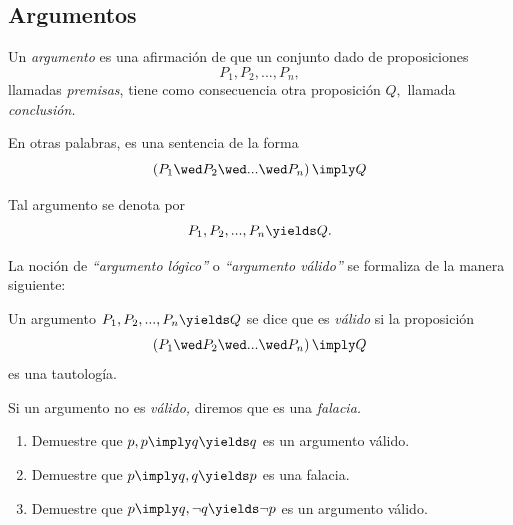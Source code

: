 \subsection{Argumentos}


 Un \emph{argumento} es una afirmación de que un conjunto dado de proposiciones $$P_{1}, P_{2},...,P_{n},$$ llamadas \emph{premisas}, tiene como consecuencia otra proposición $Q,$ llamada \emph{conclusión.}
 
 En otras palabras, es una sentencia de la forma
 $$
  \left( P_{1} \wed P_{2} \wed...\wed P_{n}\right) \imply Q
  $$
 
 
 
 Tal argumento se denota por $$P_{1}, P_{2},...,P_{n} \yields Q.$$



 La noción de \emph{``argumento lógico''} o \emph{``argumento válido''} se formaliza de la manera siguiente:
 
 
 \begin{defn}
  \label{lip:4.4}
  Un argumento $P_{1}, P_{2},...,P_{n} \yields Q$ se dice que es \emph{válido} si la proposición 
  $$
  \left( P_{1} \wed P_{2} \wed...\wed P_{n}\right) \imply Q
  $$ es una tautología.
  
   Si un argumento no es \emph{válido,} diremos que es una \emph{falacia.}
 \end{defn}




 \begin{problema}
 \label{lip:exmp:4.4}
  \begin{enumerate}
   \item Demuestre que $p, p\imply q \yields q$ es un argumento válido. 
   \item Demuestre que $p\imply q, q \yields p$ es una falacia.
   
   \item Demuestre que $p\imply q, \neg q \yields \neg p$ es un argumento válido.
  \end{enumerate}

 \end{problema}

